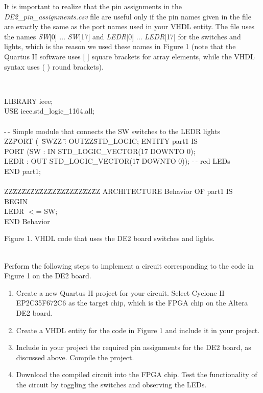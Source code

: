 \documentclass[psfig,10pt,fullpage]{article}
\begin{document}
It is important to realize that the pin assignments in the {\it DE2\_pin\_assignments.csv}
file are useful only if the pin names given in the file are exactly the same as the port names
used in your VHDL entity. The file uses the names {\it SW}[0] $\ldots$ {\it SW}[17] 
and {\it LEDR}[0] $\ldots$ {\it LEDR}[17] for the switches and lights, which is the reason
we used these names in Figure 1 (note that the Quartus II software 
uses [ ] square brackets for array elements, while
the VHDL syntax uses ( ) round brackets).

~\\
\begin{center}
\begin{minipage}[t]{12.5 cm}
\begin{tabbing}
LIBRARY ieee;\\
USE ieee.std\_logic\_1164.all;\\
~\\
-\,- Simple module that connects the SW switches to the LEDR lights\\
ZZ\=PORT (~\=SWZZ \=: OUTZZ\=STD\_LOGIC;\kill
ENTITY part1 IS \\
\>PORT (\>SW \>: IN \>STD\_LOGIC\_VECTOR(17 DOWNTO 0);\\
\>\>LEDR \>: OUT \>STD\_LOGIC\_VECTOR(17 DOWNTO 0));  -\,- red LEDs\\
END part1;\\
~\\
ZZ\=ZZ\=ZZ\=ZZ\=ZZ\=ZZ\=ZZ\=ZZ\=ZZ\=ZZ\=ZZ\kill
ARCHITECTURE Behavior OF part1 IS\\
BEGIN\\
\>LEDR $<$= SW;\\
END Behavior\\
\end{tabbing}
\end{minipage}
\end{center}

\begin{center}
Figure 1. VHDL code that uses the DE2 board switches and lights.
\end{center}

~\\
Perform the following steps to implement a circuit corresponding to the code
in Figure 1 on the DE2 board.
\begin{enumerate}
\item Create a new Quartus II project for your circuit. Select Cyclone II EP2C35F672C6
as the target chip, which is the FPGA chip on the Altera DE2 board. 
\item Create a VHDL entity for the code in Figure 1 and include it in your project.
\item Include in your project the required pin assignments for the DE2 board, as discussed
above. Compile the project.
\item Download the compiled circuit into the FPGA chip. Test the functionality of the 
circuit by toggling the switches and observing the LEDs.
\end{enumerate}
\end{document}
